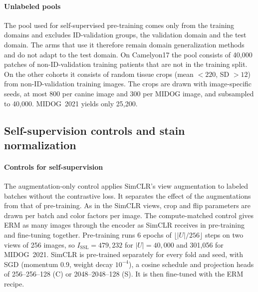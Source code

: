 \paragraph{Unlabeled pools} The pool used for self-supervised pre-training
comes only from the training domains and excludes ID-validation groups, the
validation domain and the test domain. The arms that use it therefore remain
domain generalization methods and do not adapt to the test domain. On
Camelyon17 the pool consists of 40,000 patches of non-ID-validation training
patients that are not in the training split. On the other cohorts it consists
of random tissue crops (mean $<220$, SD $>12$) from non-ID-validation training
images. The crops are drawn with image-specific seeds, at most 800 per canine
image and 300 per MIDOG image, and subsampled to 40,000. MIDOG~2021 yields
only 25,200.


\subsection{Self-supervision controls and stain normalization}
\label{sup:arms}

\paragraph{Controls for self-supervision} The augmentation-only control
applies SimCLR's view augmentation to labeled batches without the contrastive
loss. It separates the effect of the augmentations from that of pre-training.
As in the SimCLR views, crop and flip parameters are drawn per batch and color
factors per image. The compute-matched control gives ERM as many images through
the encoder as SimCLR receives in pre-training and fine-tuning together.
Pre-training runs 6 epochs of $\lfloor|U|/256\rfloor$ steps on two views of 256
images, so $I_{\text{SSL}}=479{,}232$ for $|U|=40{,}000$ and 301,056 for
MIDOG~2021. SimCLR is pre-trained separately for every fold and seed, with SGD
(momentum 0.9, weight decay $10^{-4}$), a cosine schedule and projection heads
of 256--256--128 (C) or 2048--2048--128 (S). It is then fine-tuned with the ERM
recipe.

